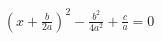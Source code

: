 \documentclass[preview]{standalone}
\begin{document}
\begin{align*}
(x + \frac{b}{2a})^2 - \frac{b^2}{4a^2} + \frac{c}{a} = 0
\end{align*}
\end{document}
